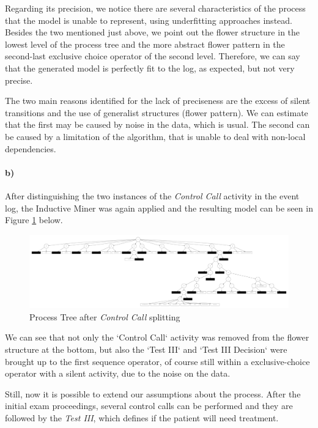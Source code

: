 \documentclass[12pt]{report}
\begin{document}
Regarding its precision, we notice there are several characteristics of the process that the model is unable to represent, using underfitting approaches instead. Besides the two mentioned just above, we point out the flower structure in the lowest level of the process tree and the more abstract flower pattern in the second-last exclusive choice operator of the second level. Therefore, we can say that the generated model is perfectly fit to the log, as expected, but not very precise.

The two main reasons identified for the lack of preciseness are the excess of silent transitions and the use of generalist structures (flower pattern). We can estimate that the first may be caused by noise in the data, which is usual. The second can be caused by a limitation of the algorithm, that is unable to deal with non-local dependencies.

\paragraph{b)} 

After distinguishing the two instances of the \emph{Control Call} activity in the event log, the Inductive Miner was again applied and the resulting model can be seen in Figure \ref{fig:figures-q1_b_tree-pdf} below.

\begin{figure}[h]
    \centering
    \includegraphics[width=\textwidth]{figures/q1_b_tree.pdf}
    \caption{Process Tree after \emph{Control Call} splitting}
    \label{fig:figures-q1_b_tree-pdf}
\end{figure}

We can see that not only the `Control Call` activity was removed from the flower structure at the bottom, but also the `Test III` and `Test III Decision` were brought up to the first sequence operator, of course still within a exclusive-choice operator with a silent activity, due to the noise on the data.

Still, now it is possible to extend our assumptions about the process. After the initial exam proceedings, several control calls can be performed and they are followed by the \emph{Test III}, which defines if the patient will need treatment.
\end{document}

